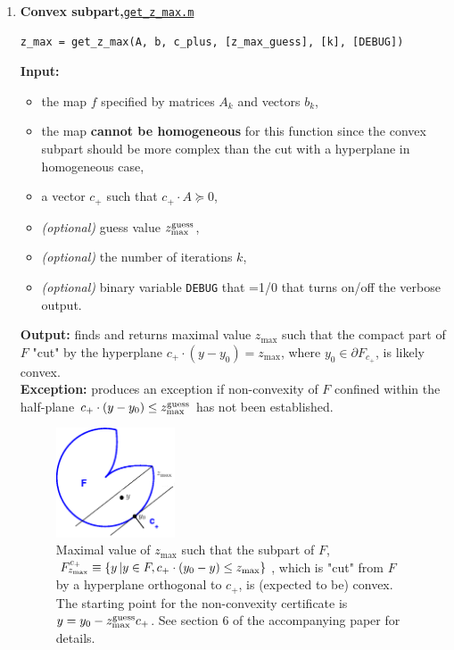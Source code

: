 \documentclass[a4paper]{article}
\theoremstyle{definition}
\begin{document}
\begin{enumerate}
\item {\bf Convex subpart,\hskip 6pt}\underline{\tt get\_z\_max.m}
\begin{verbatim}
z_max = get_z_max(A, b, c_plus, [z_max_guess], [k], [DEBUG])
\end{verbatim}
{\bf Input:}
\begin{itemize}
	\item the map $f$ specified by matrices $A_k$ and vectors $b_k$,
	\item the map {\bf cannot be homogeneous} for this function since the convex subpart should be more complex than the cut with a hyperplane in homogeneous case,
	\item a vector $c_+$ such that $c_+\cdot A\succeq 0$,
	\item {\it (optional)}  guess value  $z^{\rm guess}_{\rm max}$,
	\item {\it (optional)} the number of iterations $k$,
	\item {\it (optional)}  binary variable {\tt DEBUG} that =1/0 that turns on/off the verbose output.
\end{itemize}
{\bf Output:} finds and returns maximal value $z_{\max}$ such that the compact part of $F$ "cut" by the hyperplane  $c_+ \cdot (y-y_0)=z_{\max}$, where $y_0\in \partial F_{c_+}$, is  likely convex. \\
{\bf Exception:} produces an exception if non-convexity of $F$ confined within the half-plane $c_+ \cdot (y-y_0)\leq z^{\rm guess}_{\rm max}$  has not been established.

\begin{figure}[H]
	\centering\includegraphics[width=100pt]{fig/get_z_max}
\captionsetup{width=.8\linewidth}
	\caption{Maximal value of $z_{\max}$ such that  the subpart of $F$, $F^{c_+}_{z_{\rm max}}\equiv \{y\, | y\in F, c_+ \cdot (y_0-y)\leq z_{\rm max}\}$, which is "cut" from $F$ by a hyperplane orthogonal  to $c_+$, is (expected to be) convex. The starting point for the non-convexity certificate is $y=y_0-z^{\rm guess}_{\rm max}c_+$. See section 6 of the accompanying paper for details.}
\label{fig:four}
\end{figure}



\end{enumerate}
\end{document}
